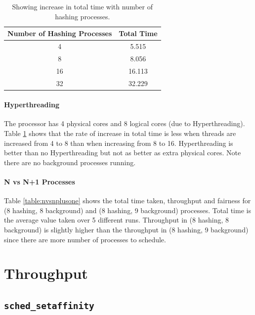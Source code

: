 \documentclass[10pt] {article}
\begin{document}
\begin{table}
\centering
\begin{tabular}{ |c|c| } 
 \hline
\textbf{Number of Hashing Processes} & \textbf{Total Time} \\
\hline
4 & 5.515 \\ 
\hline
8 & 8.056\\
\hline
16 & 16.113\\
\hline
32 & 32.229\\
\hline
\end{tabular}
\caption{Showing increase in total time with number of hashing processes.}
 \label{table:hyperthrd}
\end{table}


\paragraph{Hyperthreading}
The processor has 4 physical cores and 8 logical cores (due to Hyperthreading). Table \ref{table:hyperthrd} shows that the rate of increase in total time is less when threads are increased from 4 to 8 than when increasing from 8 to 16. Hyperthreading is better than no Hyperthreading but not as better as extra physical cores. Note there are no background processes running.





\paragraph{N vs N+1 Processes}

Table \ref{table:nvsnplusone} shows the total time taken, throughput and fairness for (8 hashing, 8 background) and (8 hashing, 9 background) processes. Total time is the average value taken over 5 different runs. Throughput in (8 hashing, 8 background) is slightly higher than the throughput in (8 hashing, 9 background) since there are more number of processes to schedule.

\section{Throughput}

\subsection{\texttt{sched\_setaffinity} }
\end{document}
